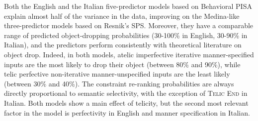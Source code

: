 Both the English and the Italian five-predictor models based on Behavioral PISA explain almost half of the variance in the data, improving on the Medina-like three-predictor models based on Resnik's SPS. Moreover, they have a comparable range of predicted object-dropping probabilities (30-100\% in English, 30-90\% in Italian), and the predictors perform consistently with theoretical literature on object drop. Indeed, in both models, atelic imperfective iterative manner-specified inputs are the most likely to drop their object (between 80\% and 90\%), while telic perfective non-iterative manner-unspecified inputs are the least likely (between 30\% and 40\%). The constraint re-ranking probabilities are always directly proportional to semantic selectivity, with the exception of \textsc{Telic End} in Italian. Both models show a main effect of telicity, but the second most relevant factor in the model is perfectivity in English and manner specification in Italian.








